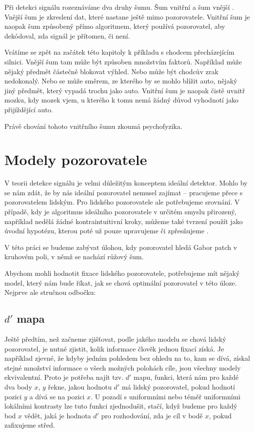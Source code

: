 Při detekci signálu rozeznáváme dva druhy šumu. Šum vnitřní a šum vnější \citep{DavidSDT}.
Vnější šum je zkreslení dat, které nastane ještě mimo pozorovatele. Vnitřní
šum je naopak šum způsobený přímo algoritmem, který používá
pozorovatel, aby dekódoval, zda signál je přítomen, či není.

Vrátíme se zpět na začátek této kapitoly k příkladu s chodcem přecházejícím silnici.
Vnější šum tam může být způsoben množstvím faktorů. Například může nějaký předmět částečně blokovat výhled. Nebo může být chodcův zrak nedokonalý. Nebo se může směrem, ze kterého by se mohlo blížit auto, nějaký jiný předmět, který vypadá trochu jako auto. Vnitřní šum je naopak čistě uvnitř mozku, kdy mozek vjem, u kterého k tomu nemá žádný důvod vyhodnotí jako přijíždějící auto.

Právě chování tohoto vnitřního šumu zkoumá psychofyzika.

\section{Modely pozorovatele}

V teorii detekce signálu je velmi důležitým konceptem ideální detektor.
Mohlo by se nám zdát, že by nás ideální pozorovatel nemusel zajímat -- pracujeme
přece s pozorovatelem lidským. Pro lidského pozorovatele ale potřebujeme srovnání.
V případě, kdy je algoritmus ideálního pozorovatele v určitém smyslu
přirozený, například nedělá žádné kontraintuitivní kroky, můžeme také tvrzení
 použít jako úvodní hypotézu, kterou
poté už pouze upravujeme či zpřesňujeme \citep{GreenSDT}.

V této práci se budeme zabývat úlohou, kdy pozorovatel hledá Gabor patch v
kruhovém poli, v němž se nachází růžový šum. 

Abychom mohli hodnotit fixace lidského pozorovatele, potřebujeme mít nějaký
model, který nám bude říkat, jak se chová optimální pozorovatel v této úloze. Nejprve ale
stručnou odbočku:

\subsection{$d'$ mapa}

Ještě předtím, než začneme zjišťovat, podle jakého modelu se chová lidský
pozorovatel, je nutné zjistit, kolik informace člověk jednou fixací získá. Je
například zjevné, že kdyby jedním pohledem bez ohledu na to, kam se dívá,
získal stejné množství informace o všech možných polohách cíle, jsou všechny
modely ekvivalentní. Proto je potřeba najít tzv. $d'$ mapu, funkci, která nám
pro každé dva body $x$, $y$ řekne, jakou hodnotu $d'$ má lidský pozorovatel,
pokud hodnotí pozici $y$ a dívá se na pozici $x$. U pozadí s uniformními nebo
téměř uniformními lokálními kontrasty lze tuto funkci zjednodušit, stačí, když
budeme pro každý bod $x$ vědět, jaká je hodnota $d'$ pro rozhodování, zda je
cíl v bodě $x$, pokud zafixujeme střed.

